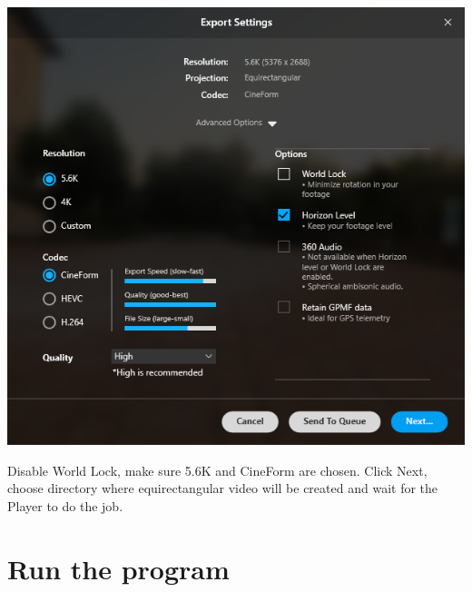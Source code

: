 \documentclass[a4paper,12pt]{book}
\begin{document}
\begin{enumerate}
\begin{minipage}[t]{\linewidth}
{	 		\includegraphics[width=.8\linewidth]{player3}%
	 	}		
	 	\medskip	
	 \end{minipage}
	 Disable World Lock, make sure 5.6K and CineForm are chosen. Click Next, choose directory where equirectangular video will be created and wait for the Player to do the job.
\end{enumerate}
\chapter{Run the program}
\end{document}

